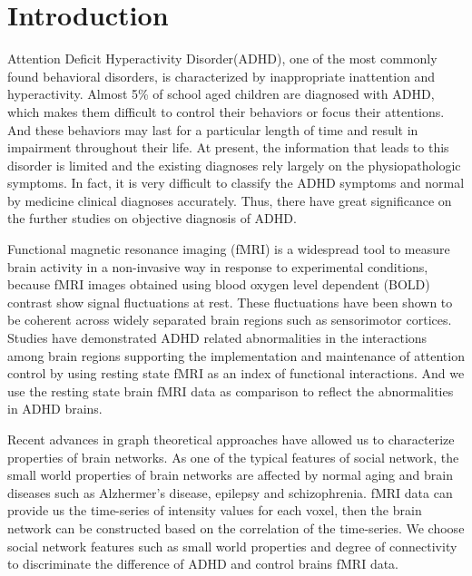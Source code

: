 \documentclass{llncs}
\begin{document}
\section{Introduction}
%
Attention Deficit Hyperactivity Disorder(ADHD), one of the most commonly found behavioral disorders, is characterized by inappropriate inattention and hyperactivity. Almost 5\% of school aged children are diagnosed with ADHD, which makes them difficult to control their behaviors or focus their attentions. And these behaviors may last for a particular length of time and result in impairment throughout their life\cite{1}. At present, the information that leads to this disorder is limited and the existing diagnoses rely largely on the physiopathologic symptoms. In fact, it is very difficult to classify the ADHD symptoms and normal by medicine clinical diagnoses accurately. Thus, there have great significance on the further studies on objective diagnosis of ADHD.


Functional magnetic resonance imaging (fMRI) is a widespread tool to measure brain activity in a non-invasive way in response to experimental conditions, because fMRI images obtained using blood oxygen level dependent (BOLD) contrast show signal fluctuations at rest. These fluctuations have been shown to be coherent across widely separated brain regions such as sensorimotor cortices\cite{2,3}. Studies have demonstrated ADHD related abnormalities in the interactions among brain regions supporting the implementation and maintenance of attention control by using resting state fMRI as an index of functional interactions\cite{4}. And we use the resting state brain fMRI data as   comparison to reflect the abnormalities in ADHD brains.


Recent advances in graph theoretical approaches have allowed us to characterize properties of brain networks. As one of the typical features of social network, the small world properties of brain networks are affected by normal aging and brain diseases\cite{5} such as Alzhermer's disease\cite{6}, epilepsy\cite{7} and schizophrenia\cite{8}. fMRI data can provide us the time-series of intensity values for each voxel, then the brain network can be constructed based on the correlation of the time-series. We choose social network features such as small world properties and degree of connectivity to discriminate the difference of ADHD and control brains fMRI data.
\end{document}
